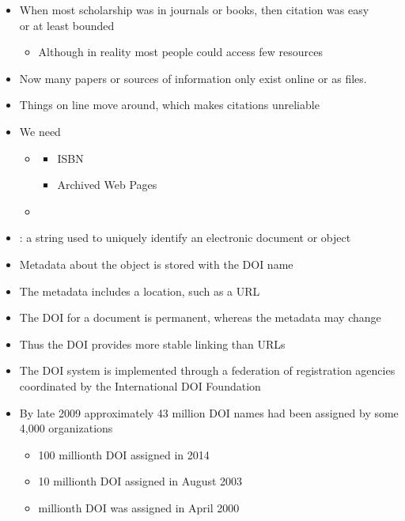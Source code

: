 \documentclass[a4paper,landscape,headrule,footrule,xetex]{foils}
\begin{document}


\begin{itemize}
\item When most scholarship was in journals or books, then citation was easy
\\ or at least bounded 
\begin{itemize}
\item[\Bad] Although in reality most people could access few resources
\end{itemize}
\item Now many papers or sources of information only exist online or as files.
\item Things on line move around, which makes citations unreliable
\item We need 
  \begin{itemize}
  \item {}
    \begin{itemize}
    \item ISBN
    \item Archived Web Pages
    \end{itemize}
  \item {}
  \end{itemize}
\end{itemize}

\begin{itemize}
\item {}: a string used to uniquely identify an electronic document or object
\item Metadata  about the object is stored with the DOI name
\item The metadata includes a location, such as a URL
\item The DOI for a document is permanent, whereas the metadata may change
\item Thus the DOI provides more stable linking than URLs
\item  The DOI system is implemented through a federation of registration agencies coordinated by the International DOI Foundation
\item By late 2009 approximately 43 million DOI names had been assigned by some 4,000 organizations
  \begin{itemize}
  \item 100 millionth DOI assigned in 2014
  \item  10 millionth DOI  assigned in August 2003
  \item  millionth DOI was assigned in April 2000
  \end{itemize}
\end{itemize}
\end{document}
